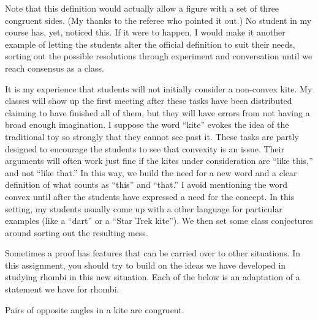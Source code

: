 \begin{annotation}
{
\color{blue}
Note that this definition would actually allow a figure with a set of three congruent sides. (My thanks to the referee who pointed it out.) No student in my course has, yet, noticed this. If it were to happen, I would make it another example of letting the students alter the official definition to suit their needs, sorting out the possible resolutions through experiment and conversation until we reach consensus as a class.

It is my experience that students will not initially consider a non-convex kite. My classes will show up the first meeting after these tasks have been distributed claiming to have finished all of them, but they will have errors from not having a broad enough imagination. I suppose the word ``kite'' 
evokes the idea of the traditional toy so strongly that they cannot see past it.
These tasks are partly designed to encourage the students to see that convexity is an issue.
Their arguments will often work just fine if the kites under consideration are ``like this,'' and not ``like that.'' In this way, we build the need for a new word and a clear definition of what counts as ``this'' and ``that.''
I avoid mentioning the word convex until after the students have expressed a need for the concept. In this setting, my students usually come up with a other language for particular examples (like a ``dart'' or a ``Star Trek kite''). We then set some class conjectures around sorting out the resulting mess.
}
\end{annotation}


Sometimes a proof has features that can be carried over to other situations.
In this assignment, you should try to build on the ideas we have developed in studying rhombi in this new situation.
Each of the below is an adaptation of a statement we have for rhombi.

\begin{conjecture}\label{conj:kite-opp-angles}
Pairs of opposite angles in a kite are congruent.
\end{conjecture}

